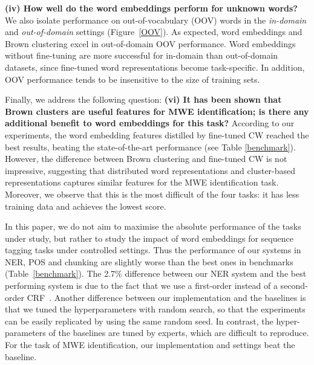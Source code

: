 \textbf{(iv) How well do the word embeddings perform for unknown words?}
We also isolate performance on out-of-vocabulary (OOV) words 
in the \textit{in-domain} and \textit{out-of-domain} settings (Figure~\ref{OOV}).
As expected, word embeddings and Brown clustering excel in out-of-domain OOV performance.
Word embeddings without\nss{[with?]} fine-tuning are more successful for 
in-domain than out-of-domain datasets, since fine-tuned
word representations become task-specific. 
In addition, OOV performance tends to be insensitive to the size of training sets.


Finally, we address the following question: \textbf{(vi) It has been shown that Brown clusters are useful features for MWE identification; is there any additional benefit to word embeddings for this task?} 
According to our experiments, the word embedding features distilled by fine-tuned CW reached the best results, beating the state-of-the-art performance (see Table \ref{benchmark}).
However, the difference between Brown clustering and fine-tuned CW is not impressive, suggesting that distributed word representations and cluster-based representations captures similar features for the MWE identification task. Moreover, we observe that this is the most difficult of the four tasks: it has less training data and achieves the lowest score.


In this paper, we do not aim to maximise the absolute performance of the tasks under 
study, but rather to study the impact of word embeddings for sequence tagging tasks under controlled settings. Thus the performance of our systems in NER, POS and chunking are slightly worse than the best ones in benchmarks (Table~\ref{benchmark}). The 2.7\% difference between our NER system and the best performing system is due to the fact that we use a first-order instead of a second-order CRF~\cite{Ando:2005}. 
Another difference between our implementation and the baselines is that we tuned the hyperparameters with random search, so that the experiments can be easily replicated by using the same random seed. In contrast, the hyper-parameters of the baselines are tuned by experts, which are difficult to reproduce. For the task of MWE identification, our implementation and settings beat the baseline.



